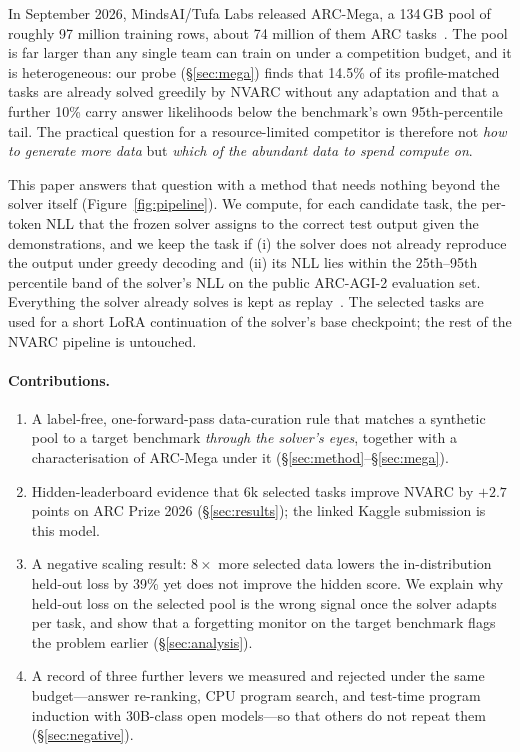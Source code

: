 \documentclass[11pt]{article}
\newcommand{\nvarc}{NVARC}
\newcommand{\mega}{ARC-Mega}
\begin{document}
In September 2026, MindsAI/Tufa Labs released \mega{}, a 134\,GB pool of roughly 97 million training rows, about 74 million of them ARC tasks~\citep{arcmega2025}. The pool is far larger than any single team can train on under a competition budget, and it is heterogeneous: our probe (\S\ref{sec:mega}) finds that 14.5\% of its profile-matched tasks are already solved greedily by \nvarc{} without any adaptation and that a further 10\% carry answer likelihoods below the benchmark's own 95th-percentile tail. The practical question for a resource-limited competitor is therefore not \emph{how to generate more data} but \emph{which of the abundant data to spend compute on}.

This paper answers that question with a method that needs nothing beyond the solver itself (Figure~\ref{fig:pipeline}). We compute, for each candidate task, the per-token NLL that the frozen solver assigns to the correct test output given the demonstrations, and we keep the task if (i) the solver does not already reproduce the output under greedy decoding and (ii) its NLL lies within the 25th--95th percentile band of the solver's NLL on the public ARC-AGI-2 evaluation set. Everything the solver already solves is kept as replay~\citep{rolnick2019replay}. The selected tasks are used for a short LoRA continuation of the solver's base checkpoint; the rest of the \nvarc{} pipeline is untouched.

\paragraph{Contributions.}
\begin{enumerate}
\item A label-free, one-forward-pass data-curation rule that matches a synthetic pool to a target benchmark \emph{through the solver's eyes}, together with a characterisation of \mega{} under it (\S\ref{sec:method}--\S\ref{sec:mega}).
\item Hidden-leaderboard evidence that 6k selected tasks improve \nvarc{} by $+2.7$ points on ARC Prize 2026 (\S\ref{sec:results}); the linked Kaggle submission is this model.
\item A negative scaling result: $8\times$ more selected data lowers the in-distribution held-out loss by 39\% yet does not improve the hidden score. We explain why held-out loss on the selected pool is the wrong signal once the solver adapts per task, and show that a forgetting monitor on the target benchmark flags the problem earlier (\S\ref{sec:analysis}).
\item A record of three further levers we measured and rejected under the same budget---answer re-ranking, CPU program search, and test-time program induction with 30B-class open models---so that others do not repeat them (\S\ref{sec:negative}).
\end{enumerate}
\end{document}
